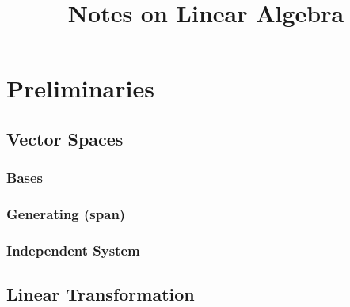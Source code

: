 


\title{Notes on Linear Algebra}

\maketitle

\chapter{Preliminaries}
\section{Vector Spaces}
\subsection{Bases}
\subsection{Generating (span)}
\subsection{Independent System}
\section{Linear Transformation}










